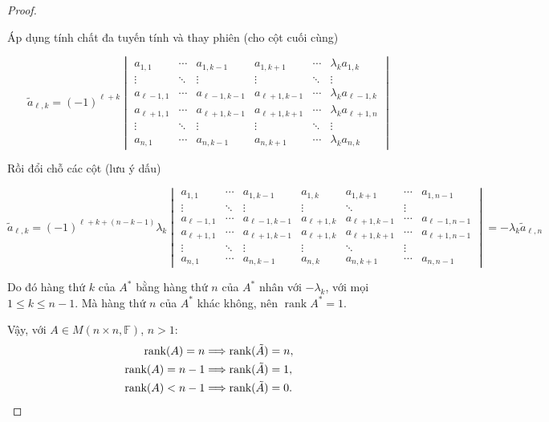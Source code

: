\documentclass[class=nhvh-linear-algebra,crop=false]{standalone}
\begin{document}
\begin{proof}
\begin{enumerate}[label = \textbf{Trường hợp \arabic*.},itemindent=2cm]
		      Áp dụng tính chất đa tuyến tính và thay phiên (cho cột cuối cùng)

		      \[\tilde{a}_{\ell, k} = {(-1)}^{\ell + k} \begin{vmatrix} a_{1,1} & \cdots & a_{1,k-1} & a_{1,k+1} & \cdots & \lambda_{k}a_{1,k} \\ \vdots & \ddots & \vdots & \vdots & \ddots & \vdots \\ a_{\ell - 1,1} & \cdots & a_{\ell-1,k-1} & a_{\ell+1,k-1} & \cdots & \lambda_{k} a_{\ell-1,k} \\ a_{\ell+1,1} & \cdots & a_{\ell+1,k-1} & a_{\ell+1,k+1} & \cdots & \lambda_{k} a_{\ell+1,n} \\ \vdots & \ddots & \vdots & \vdots & \ddots & \vdots \\ a_{n,1} & \cdots & a_{n,k-1} & a_{n,k+1} & \cdots & \lambda_{k}a_{n,k} \end{vmatrix}\]

		      Rồi đổi chỗ các cột (lưu ý dấu)

		      \[\tilde{a}_{\ell, k} = {(-1)}^{\ell + k + (n - k - 1)}\lambda_{k} \begin{vmatrix} a_{1,1} & \cdots & a_{1,k-1} & a_{1,k} & a_{1,k+1} & \cdots & a_{1,n-1} \\ \vdots & \ddots & \vdots & \vdots & \ddots & \vdots \\ a_{\ell - 1,1} & \cdots & a_{\ell-1,k-1} & a_{\ell+1,k} & a_{\ell+1,k-1} & \cdots & a_{\ell-1,n-1} \\ a_{\ell+1,1} & \cdots & a_{\ell+1,k-1} & a_{\ell+1,k} & a_{\ell+1,k+1} & \cdots & a_{\ell+1,n-1} \\ \vdots & \ddots & \vdots & \vdots & \ddots & \vdots \\ a_{n,1} & \cdots & a_{n,k-1} & a_{n,k} & a_{n,k+1} & \cdots & a_{n,n-1} \end{vmatrix} = -\lambda_{k} \tilde{a}_{\ell,n} \]


		      Do đó hàng thứ $k$ của $A^{*}$ bằng hàng thứ $n$ của $A^{*}$ nhân với $-\lambda_{k}$, với mọi $1\leq k\leq n-1$. Mà hàng thứ $n$ của $A^{*}$ khác không, nên $\operatorname{rank} A^{*} = 1$.
	\end{enumerate}

	\par Vậy, với $A\in M(n\times n,\mathbb{F})$, $n > 1$:
	\begin{align*}
		\text{rank}(A) = n   & \Longrightarrow \text{rank}(\tilde{A}) = n, \\
		\text{rank}(A) = n-1 & \Longrightarrow \text{rank}(\tilde{A}) = 1, \\
		\text{rank}(A) < n-1 & \Longrightarrow \text{rank}(\tilde{A}) = 0.
	\end{align*}
\end{proof}
\end{document}
